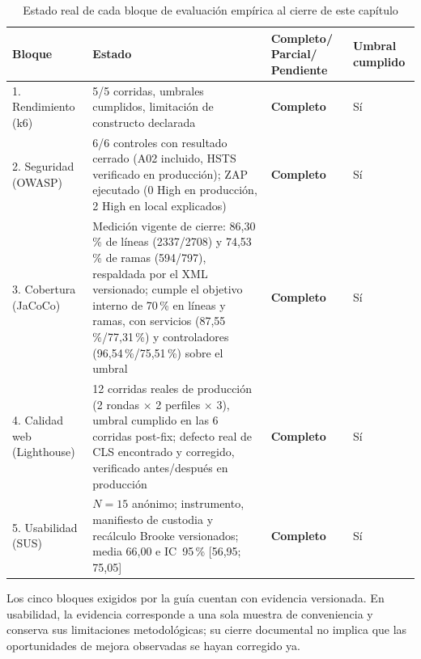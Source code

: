 \begin{table}[h]
\centering
\small
\begin{tabularx}{\linewidth}{@{}p{2.5cm}Xp{2.0cm}p{2.0cm}@{}}
\toprule
Bloque & Estado & Completo/ Parcial/ Pendiente & Umbral cumplido \\
\midrule
1. Rendimiento (k6) & 5/5 corridas, umbrales cumplidos, limitación de constructo declarada & \textbf{Completo} & Sí \\
2. Seguridad (OWASP) & 6/6 controles con resultado cerrado (A02 incluido, HSTS verificado en producción); ZAP ejecutado (0 High en producción, 2 High en local explicados) & \textbf{Completo} & Sí \\
3. Cobertura (JaCoCo) & Medición vigente de cierre: 86,30\,\% de líneas (2337/2708) y 74,53\,\% de ramas (594/797), respaldada por el XML versionado; cumple el objetivo interno de 70\,\% en líneas y ramas, con servicios (87,55\,\%/77,31\,\%) y controladores (96,54\,\%/75,51\,\%) sobre el umbral & \textbf{Completo} & Sí \\
4. Calidad web (Lighthouse) & 12 corridas reales de producción (2 rondas $\times$ 2 perfiles $\times$ 3), umbral cumplido en las 6 corridas post-fix; defecto real de CLS encontrado y corregido, verificado antes/después en producción & \textbf{Completo} & Sí \\
5. Usabilidad (SUS) & $N=15$ anónimo; instrumento, manifiesto de custodia y recálculo Brooke versionados; media 66,00 e IC~95\,\% [56,95; 75,05] & \textbf{Completo} & Sí \\
\bottomrule
\end{tabularx}
\caption{Estado real de cada bloque de evaluación empírica al cierre de este capítulo}
\label{tab:res-resumen}
\end{table}

Los cinco bloques exigidos por la guía cuentan con evidencia versionada.
En usabilidad, la evidencia corresponde a una sola muestra de conveniencia
y conserva sus limitaciones metodológicas; su cierre documental no implica
que las oportunidades de mejora observadas se hayan corregido ya.
